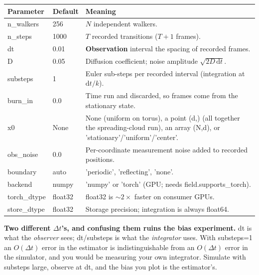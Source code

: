 \documentclass[11pt,a4paper]{article}
\newcommand{\code}[1]{{\ttfamily\small #1}}
\begin{document}
\begin{center}
\begin{tabular}{@{}L{0.20\textwidth} L{0.13\textwidth} L{0.59\textwidth}@{}}
\toprule
\textbf{Parameter} & \textbf{Default} & \textbf{Meaning} \\
\midrule
\code{n\_walkers}  & 256   & $N$ independent walkers. \\
\code{n\_steps}    & 1000  & $T$ recorded transitions ($T+1$ frames). \\
\code{dt}          & 0.01  & \textbf{Observation} interval \textemdash{} the spacing of recorded frames. \\
\code{D}           & 0.05  & Diffusion coefficient; noise amplitude $\sqrt{2D\,\mathrm{d}t}$. \\
\code{substeps}    & 1     & Euler sub-steps per recorded interval (integration at $\mathrm{d}t/k$). \\
\code{burn\_in}    & 0.0   & Time run and discarded, so frames come from the stationary state. \\
\code{x0}          & None  & \code{None} (uniform on torus), a point \code{(d,)} (all together \textemdash{} the spreading-cloud run), an array \code{(N,d)}, or \code{'stationary'}/\code{'uniform'}/\code{'center'}. \\
\code{obs\_noise}  & 0.0   & Per-coordinate measurement noise added to recorded positions. \\
\code{boundary}    & auto  & \code{'periodic'}, \code{'reflecting'}, \code{'none'}. \\
\code{backend}     & numpy & \code{'numpy'} or \code{'torch'} (GPU; needs \code{field.supports\_torch}). \\
\code{torch\_dtype}& float32 & float32 is $\sim2\times$ faster on consumer GPUs. \\
\code{store\_dtype}& float32 & Storage precision; integration is always float64. \\
\bottomrule
\end{tabular}
\end{center}

\begin{keybox}
\textbf{Two different $\Delta t$'s, and confusing them ruins the bias experiment.}
\code{dt} is what the \emph{observer} sees; \code{dt/substeps} is what the
\emph{integrator} uses. With \code{substeps=1} an $O(\Delta t)$ error in the estimator
is indistinguishable from an $O(\Delta t)$ error in the simulator, and you would be
measuring your own integrator. Simulate with \code{substeps} large, observe at
\code{dt}, and the bias you plot is the estimator's.
\end{keybox}
\end{document}
